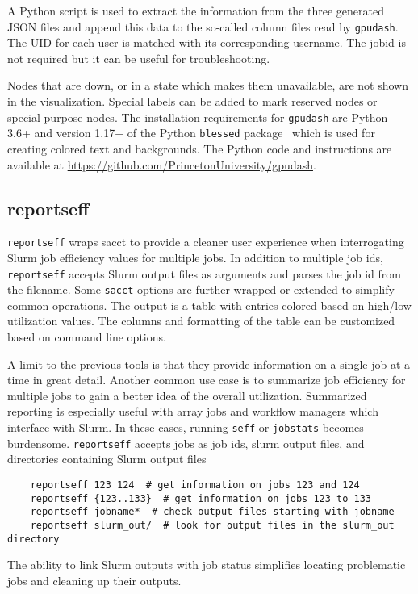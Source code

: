 \noindent
A Python script is used to extract the information from the three generated JSON files and append this data to the so-called column files read by \texttt{gpudash}. The UID for each user is matched with its corresponding username. The jobid is not required but it can be useful for troubleshooting.

Nodes that are down, or in a state which makes them unavailable, are not shown in the visualization. Special labels can be added to mark reserved nodes or special-purpose nodes. The installation requirements for \texttt{gpudash} are Python 3.6+ and version 1.17+ of the Python \texttt{blessed} package~\cite{rose} which is used for creating colored text and backgrounds. The Python code and instructions are available at \url{https://github.com/PrincetonUniversity/gpudash}.



\subsection{reportseff}

\texttt{reportseff} wraps sacct to provide a cleaner user experience when interrogating Slurm job efficiency values for multiple jobs. In addition to multiple job ids, \texttt{reportseff} accepts Slurm output files as arguments and parses the job id from the filename.  Some \texttt{sacct} options are further wrapped or extended to simplify common operations.  The output is a table with entries colored based on high/low utilization values.  The columns and formatting of the table can be customized based on command line options.

A limit to the previous tools is that they provide information on a single job at a time in great detail.  Another common use case is to summarize job efficiency for multiple jobs to gain a better idea of the overall utilization.  Summarized reporting is especially useful with array jobs and workflow managers which interface with Slurm.  In these cases, running \texttt{seff} or \texttt{jobstats} becomes burdensome.  \texttt{reportseff} accepts jobs as job ids, slurm output files, and directories containing Slurm output files
\begin{verbatim}
    reportseff 123 124  # get information on jobs 123 and 124
    reportseff {123..133}  # get information on jobs 123 to 133
    reportseff jobname*  # check output files starting with jobname
    reportseff slurm_out/  # look for output files in the slurm_out directory
\end{verbatim}
The ability to link Slurm outputs with job status simplifies locating problematic jobs and cleaning up their outputs.

